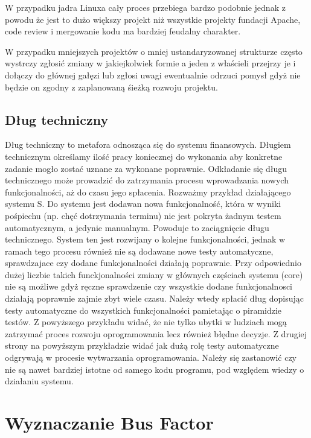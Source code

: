 \documentclass[a4paper,11pt,twoside]{report}
\theoremstyle{definition}
\begin{document}
W przypadku jadra Linuxa cały proces przebiega bardzo podobnie jednak z powodu 
że jest to dużo większy projekt niż wszystkie projekty fundacji Apache, 
code review i mergowanie kodu ma bardziej feudalny charakter.

W przypadku mniejszych projektów o mniej ustandaryzowanej strukturze często 
wystrczy zgłosić zmiany w jakiejkolwiek formie a jeden z właścieli przejrzy 
je i dołączy do głównej gałęzi lub zgłosi uwagi ewentualnie odrzuci 
pomysł gdyż nie będzie on zgodny z zaplanowaną śieżką rozwoju projektu.

\section{Dług techniczny}
Dług techniczny to metafora odnosząca się do systemu finansowych. Długiem 
technicznym określamy ilość pracy koniecznej do wykonania aby konkretne 
zadanie mogło zostać uznane za wykonane poprawnie. Odkładanie się długu 
technicznego może prowadzić do zatrzymania procesu wprowadzania nowych 
funkcjonalności, aż do czasu jego spłacenia. 
Rozważmy przykład działającego systemu S. Do systemu jest dodawan nowa 
funkcjonalność, która w wyniki pośpiechu (np. chęć dotrzymania terminu) 
nie jest pokryta żadnym testem automatycznym, a jedynie manualnym. Powoduje to 
zaciągnięcie długu technicznego. System ten jest rozwijany o kolejne 
funkcjonalności, jednak w ramach tego procesu również nie są dodawane nowe 
testy automatyczne, sprawdzajace czy dodane funkcjonalności działają 
poprawnie. Przy odpowiednio dużej liczbie takich funckjonalności zmiany w 
głównych częściach systemu (core) nie są możliwe gdyż ręczne 
sprawdzenie czy wszystkie dodane funkcjonalnosci działają poprawnie zajmie 
zbyt wiele czasu. Należy wtedy spłacić dług dopisując testy automatyczne 
do wszystkich funkcjonalności pamietając o piramidzie testów.  
Z powyższego przykładu widać, że nie tylko ubytki w ludziach mogą 
zatrzymać proces rozwoju oprogramowania lecz również błędne decyzje. Z 
drugiej strony na powyższym przykładzie widać jak dużą rolę testy 
automatyczne odgrywają w procesie wytwarzania oprogramowania. Należy się 
zastanowić czy nie są nawet bardziej istotne od samego kodu programu, pod 
względem wiedzy o działaniu systemu.



\chapter{Wyznaczanie Bus Factor}
\end{document}
